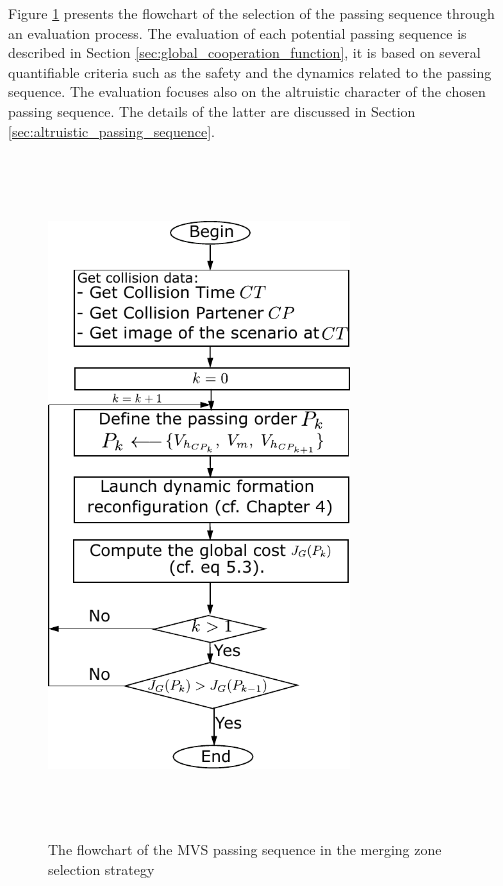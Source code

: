  

Figure \ref{fig:negotiation} presents the flowchart of the selection of the passing sequence through an evaluation process. The evaluation of each potential passing sequence is described in Section \ref{sec:global_cooperation_function}, it is based on several quantifiable criteria such as the safety and the dynamics related to the passing sequence. The evaluation focuses also on the altruistic character of the chosen passing sequence. The details of the latter are discussed in Section \ref{sec:altruistic_passing_sequence}. 


    \begin{figure}[!h]
        \centering 
        \includegraphics[width=8cm,height=18cm,keepaspectratio]{chapters/Chapitre_6/Figures/Negotiation.pdf}
        \caption{The flowchart of the MVS passing sequence in the merging zone selection strategy}
        \label{fig:negotiation}
        \end{figure}




